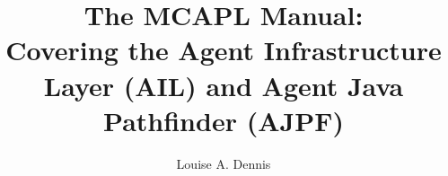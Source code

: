 \documentclass[a4]{book}
\author{Louise A. Dennis}
\title{The MCAPL Manual: \\
Covering the Agent Infrastructure Layer (AIL) and Agent Java Pathfinder (AJPF)}
\begin{document}
\maketitle

\tableofcontents

\SetJava








% 
% 


\printindex
\end{document}
